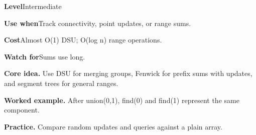 \documentclass[10pt,letterpaper]{article}
\newcommand{\entrylabel}[1]{\textcolor{accent}{\bfseries #1}}
\begin{document}
\begin{guidebox}\small
\entrylabel{Level}\quad Intermediate\par
\entrylabel{Use when}\quad Track connectivity, point updates, or range sums.\par
\entrylabel{Cost}\quad Almost O(1) DSU; O(log n) range operations.\par
\entrylabel{Watch for}\quad Sums use long.\par
\end{guidebox}
\noindent\textbf{Core idea.} Use DSU for merging groups, Fenwick for prefix sums with updates, and segment trees for general ranges.\par
\noindent\textbf{Worked example.} After union(0,1), find(0) and find(1) represent the same component.\par
\noindent\textbf{Practice.} Compare random updates and queries against a plain array.\par
\end{document}
